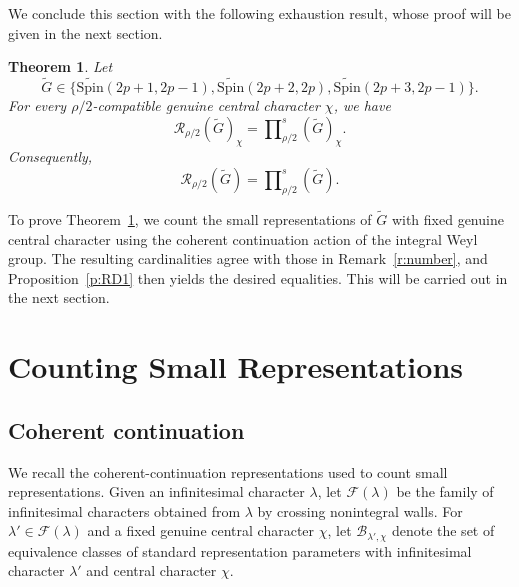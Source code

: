 \documentclass{amsart}
\newcommand{\Spin}{{\mathrm{Spin}}}
\newtheorem{thm}{Theorem}[section]
\theoremstyle{definition}
\newcommand{\calB}{{\mathcal{B}}}
\newcommand{\calF}{{\mathcal{F}}}
\begin{document}
We conclude this section with the following exhaustion result, whose
proof will be given in the next section.





\begin{thm}\label{t:small-exhaustion}
Let
\begin{equation*}
\widetilde G\in
\{\widetilde{\Spin}(2p+1,2p-1),
\widetilde{\Spin}(2p+2,2p),
\widetilde{\Spin}(2p+3,2p-1)\}.
\end{equation*}
For every $\rho/2$-compatible genuine central character $\chi$, we have
\begin{equation*}
\mathcal R_{\rho/2}(\widetilde G)_\chi
=
\prod\nolimits_{\rho/2}^{s}(\widetilde G)_\chi.
\end{equation*}
Consequently,
\begin{equation*}
\mathcal R_{\rho/2}(\widetilde G)
=
\prod\nolimits_{\rho/2}^{s}(\widetilde G).
\end{equation*}
\end{thm}

To prove Theorem~\ref{t:small-exhaustion}, we count the small
representations of \(\widetilde G\) with fixed genuine central
character using the coherent continuation action of the integral
Weyl group. The resulting cardinalities agree with those in
Remark~\ref{r:number}, and Proposition~\ref{p:RD1} then yields the
desired equalities. This will be carried out in the next section.




\section{Counting Small Representations}
\label{s:counting}

\subsection{Coherent continuation}

We recall the coherent-continuation representations used to count small representations. Given an infinitesimal character $\lambda$, let $\calF(\lambda)$ be the family of infinitesimal characters obtained from $\lambda$ by crossing nonintegral walls. For $\lambda'\in\calF(\lambda)$ and a fixed genuine central character $\chi$, let $\calB_{\lambda',\chi}$ denote the set of equivalence classes of standard representation parameters with infinitesimal character $\lambda'$ and central character $\chi$.
\end{document}
